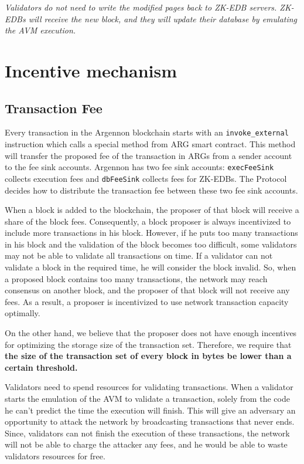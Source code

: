 \documentclass[11pt, A4]{report}
\begin{document}
    \emph{Validators do not need to write the modified pages back to ZK-EDB servers. ZK-EDBs will receive the new
    block, and they will update their database by emulating the AVM execution.}


    \section{Incentive mechanism}\label{sec:incentive-mechanism}

    \subsection{Transaction Fee}\label{subsec:transaction-fee}

    Every transaction in the Argennon blockchain starts with an \texttt{invoke\_external} instruction which calls a
    special method from ARG smart contract. This method will transfer the proposed fee of the transaction in ARGs
    from a sender account to the fee sink accounts. Argennon has two fee sink accounts: \texttt{execFeeSink} collects
    execution fees and \texttt{dbFeeSink} collects fees for ZK-EDBs. The Protocol decides how to distribute the
    transaction fee between these two fee sink accounts.

    When a block is added to the blockchain, the proposer of that block will receive a share of the block fees.
    Consequently, a block proposer is always incentivized to include more transactions in his block. However, if he
    puts too many transactions in his block and the validation of the block becomes too difficult, some validators
    may not be able to validate all transactions on time. If a validator can not validate a block in the required
    time, he will consider the block invalid. So, when a proposed block contains too many transactions, the network
    may reach consensus on another block, and the proposer of that block will not receive any fees. As a result, a
    proposer is incentivized to use network transaction capacity optimally.

    On the other hand, we believe that the proposer does not have enough incentives for optimizing the storage size
    of the transaction set. Therefore, we require that \textbf{the size of the transaction set of every block in
    bytes be lower than a certain threshold.}

    Validators need to spend resources for validating transactions. When a validator starts the emulation of the AVM
    to validate a transaction, solely from the code he can't predict the time the execution will finish. This will
    give an adversary an opportunity to attack the network by broadcasting transactions that never ends. Since,
    validators can not finish the execution of these transactions, the network will not be able to charge the
    attacker any fees, and he would be able to waste validators resources for free.
\end{document}
